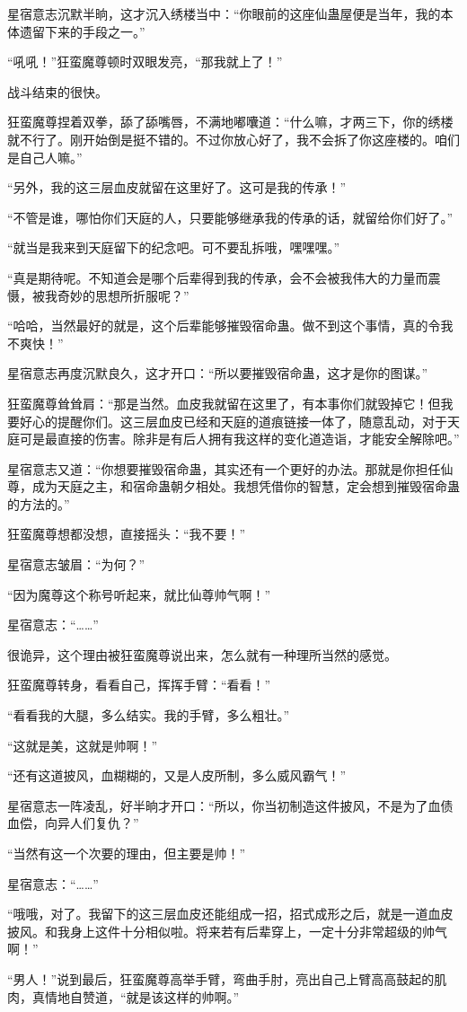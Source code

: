 \begin{this_body}
星宿意志沉默半晌，这才沉入绣楼当中：“你眼前的这座仙蛊屋便是当年，我的本体遗留下来的手段之一。”

“吼吼！”狂蛮魔尊顿时双眼发亮，“那我就上了！”

战斗结束的很快。

狂蛮魔尊捏着双拳，舔了舔嘴唇，不满地嘟囔道：“什么嘛，才两三下，你的绣楼就不行了。刚开始倒是挺不错的。不过你放心好了，我不会拆了你这座楼的。咱们是自己人嘛。”

“另外，我的这三层血皮就留在这里好了。这可是我的传承！”

“不管是谁，哪怕你们天庭的人，只要能够继承我的传承的话，就留给你们好了。”

“就当是我来到天庭留下的纪念吧。可不要乱拆哦，嘿嘿嘿。”

“真是期待呢。不知道会是哪个后辈得到我的传承，会不会被我伟大的力量而震慑，被我奇妙的思想所折服呢？”

“哈哈，当然最好的就是，这个后辈能够摧毁宿命蛊。做不到这个事情，真的令我不爽快！”

星宿意志再度沉默良久，这才开口：“所以要摧毁宿命蛊，这才是你的图谋。”

狂蛮魔尊耸耸肩：“那是当然。血皮我就留在这里了，有本事你们就毁掉它！但我要好心的提醒你们。这三层血皮已经和天庭的道痕链接一体了，随意乱动，对于天庭可是最直接的伤害。除非是有后人拥有我这样的变化道造诣，才能安全解除吧。”

星宿意志又道：“你想要摧毁宿命蛊，其实还有一个更好的办法。那就是你担任仙尊，成为天庭之主，和宿命蛊朝夕相处。我想凭借你的智慧，定会想到摧毁宿命蛊的方法的。”

狂蛮魔尊想都没想，直接摇头：“我不要！”

星宿意志皱眉：“为何？”

“因为魔尊这个称号听起来，就比仙尊帅气啊！”

星宿意志：“……”

很诡异，这个理由被狂蛮魔尊说出来，怎么就有一种理所当然的感觉。

狂蛮魔尊转身，看看自己，挥挥手臂：“看看！”

“看看我的大腿，多么结实。我的手臂，多么粗壮。”

“这就是美，这就是帅啊！”

“还有这道披风，血糊糊的，又是人皮所制，多么威风霸气！”

星宿意志一阵凌乱，好半晌才开口：“所以，你当初制造这件披风，不是为了血债血偿，向异人们复仇？”

“当然有这一个次要的理由，但主要是帅！”

星宿意志：“……”

“哦哦，对了。我留下的这三层血皮还能组成一招，招式成形之后，就是一道血皮披风。和我身上这件十分相似啦。将来若有后辈穿上，一定十分非常超级的帅气啊！”

“男人！”说到最后，狂蛮魔尊高举手臂，弯曲手肘，亮出自己上臂高高鼓起的肌肉，真情地自赞道，“就是该这样的帅啊。”

\end{this_body}

